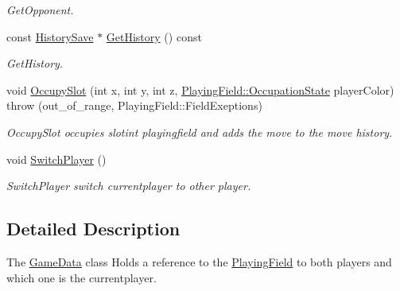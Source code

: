 \begin{DoxyCompactItemize}
\begin{DoxyCompactList}\small\item\em Get\-Opponent. \end{DoxyCompactList}\item 
const \hyperlink{classHistorySave}{History\-Save} $\ast$ \hyperlink{classGameData_a05cb9224475efb01fa67018559c8fcce}{Get\-History} () const 
\begin{DoxyCompactList}\small\item\em Get\-History. \end{DoxyCompactList}\item 
void \hyperlink{classGameData_a5e1d9b00d89fea74a17e653057b47541}{Occupy\-Slot} (int x, int y, int z, \hyperlink{classPlayingField_ac6df152a3f820aa04a00ab4df4a9d265}{Playing\-Field\-::\-Occupation\-State} player\-Color)  throw (out\-\_\-of\-\_\-range, Playing\-Field\-::\-Field\-Exeptions)
\begin{DoxyCompactList}\small\item\em Occupy\-Slot occupies slotint playingfield and adds the move to the move history. \end{DoxyCompactList}\item 
\hypertarget{classGameData_a18924e62415d38e1651ef1ab7d488996}{void \hyperlink{classGameData_a18924e62415d38e1651ef1ab7d488996}{Switch\-Player} ()}\label{classGameData_a18924e62415d38e1651ef1ab7d488996}

\begin{DoxyCompactList}\small\item\em Switch\-Player switch currentplayer to other player. \end{DoxyCompactList}\end{DoxyCompactItemize}


\subsection{Detailed Description}
The \hyperlink{classGameData}{Game\-Data} class Holds a reference to the \hyperlink{classPlayingField}{Playing\-Field} to both players and which one is the currentplayer. 

